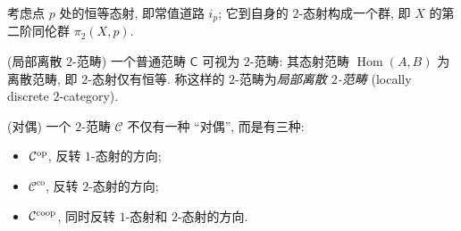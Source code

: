 \begin{example}
\begin{itemize}
\begin{tikzpicture}[x=0.4pt,y=0.4pt,yscale=-1,xscale=1]
			
			
			
		\end{tikzpicture}
		$$
	\end{itemize}
	考虑点 $p$ 处的恒等态射, 即常值道路 $i_p$; 它到自身的 $2$-态射构成一个群, 即 $X$ 的第二阶同伦群 $\pi_2(X,p)$.
\end{example}

\begin{example}
	[label={locally-discrete-2-category}]
	{(局部离散 $2$-范畴)}
	一个普通范畴 $\mathsf C$ 可视为 $2$-范畴: 其态射范畴 $\operatorname{Hom}(A,B)$ 为离散范畴, 即 $2$-态射仅有恒等.
	称这样的 $2$-范畴为\emph{局部离散 $2$-范畴} (locally discrete $2$-category).
\end{example}

\begin{definition}
	{(对偶)}
	一个 $2$-范畴 $\mathcal C$ 不仅有一种 ``对偶'', 而是有三种:
	\begin{itemize}
		\item $\mathcal C^{\text{op}}$, 反转 $1$-态射的方向;
		\item $\mathcal C^{\text{co}}$, 反转 $2$-态射的方向;
		\item $\mathcal C^{\text{co}\text{op}}$, 同时反转 $1$-态射和 $2$-态射的方向.
	\end{itemize}
\end{definition}

